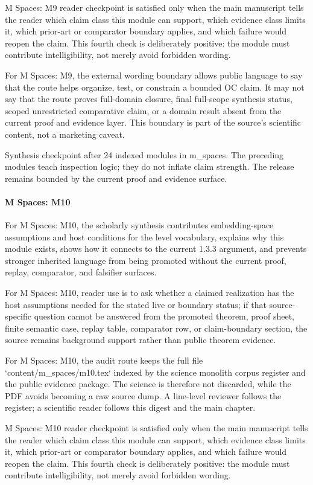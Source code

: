 M Spaces: M9 reader checkpoint is satisfied only when the main manuscript tells the reader which claim class this module can support, which evidence class limits it, which prior-art or comparator boundary applies, and which failure would reopen the claim. This fourth check is deliberately positive: the module must contribute intelligibility, not merely avoid forbidden wording.


For M Spaces: M9, the external wording boundary allows public language to say that the route helps organize, test, or constrain a bounded OC claim. It may not say that the route proves full-domain closure, final full-scope synthesis status, scoped unrestricted comparative claim, or a domain result absent from the current proof and evidence layer. This boundary is part of the source's scientific content, not a marketing caveat.


Synthesis checkpoint after 24 indexed modules in m\_spaces. The preceding modules teach inspection logic; they do not inflate claim strength. The release remains bounded by the current proof and evidence surface.


\paragraph{M Spaces: M10}

For M Spaces: M10, the scholarly synthesis contributes embedding-space assumptions and host conditions for the level vocabulary, explains why this module exists, shows how it connects to the current 1.3.3 argument, and prevents stronger inherited language from being promoted without the current proof, replay, comparator, and falsifier surfaces.


For M Spaces: M10, reader use is to ask whether a claimed realization has the host assumptions needed for the stated live or boundary status; if that source-specific question cannot be answered from the promoted theorem, proof sheet, finite semantic case, replay table, comparator row, or claim-boundary section, the source remains background support rather than public theorem evidence.


For M Spaces: M10, the audit route keeps the full file `content/m\_spaces/m10.tex` indexed by the science monolith corpus register and the public evidence package. The science is therefore not discarded, while the PDF avoids becoming a raw source dump. A line-level reviewer follows the register; a scientific reader follows this digest and the main chapter.


M Spaces: M10 reader checkpoint is satisfied only when the main manuscript tells the reader which claim class this module can support, which evidence class limits it, which prior-art or comparator boundary applies, and which failure would reopen the claim. This fourth check is deliberately positive: the module must contribute intelligibility, not merely avoid forbidden wording.


